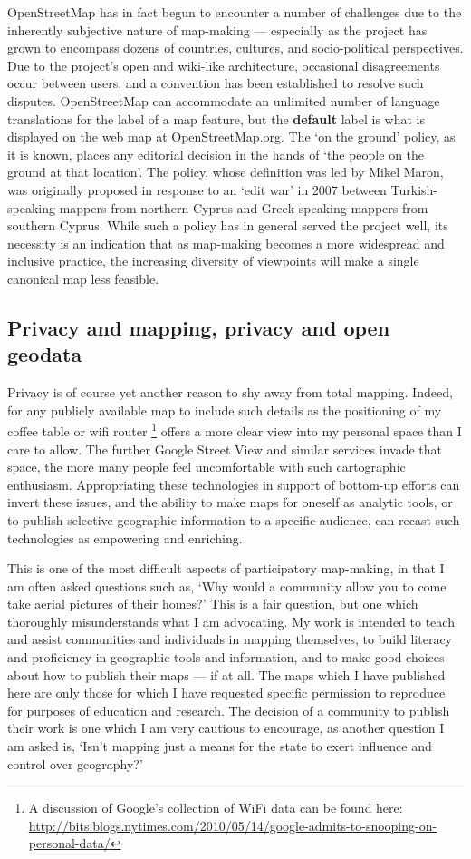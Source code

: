 \documentclass[11pt,oneside,notitlepage]{report}
\begin{document}
OpenStreetMap has in fact begun to encounter a number of challenges due to the inherently subjective nature of map-making --- especially as the project has grown to encompass dozens of countries, cultures, and socio-political perspectives. Due to the project's open and wiki-like architecture, occasional disagreements occur between users, and a convention has been established to resolve such disputes. OpenStreetMap can accommodate an unlimited number of language translations for the label of a map feature, but the \textbf{default} label is what is displayed on the web map at OpenStreetMap.org. The `on the ground' policy, as it is known, places any editorial decision in the hands of `the people on the ground at that location'. The policy, whose definition was led by Mikel Maron, was originally proposed in response to an `edit war' in 2007 between Turkish-speaking mappers from northern Cyprus and Greek-speaking mappers from southern Cyprus. \cite{osm2007disputes} While such a policy has in general served the project well, its necessity is an indication that as map-making becomes a more widespread and inclusive practice, the increasing diversity of viewpoints will make a single canonical map less feasible. 

\subsection{Privacy and mapping, privacy and open geodata}

Privacy is of course yet another reason to shy away from total mapping. Indeed, for any publicly available map to include such details as the positioning of my coffee table or wifi router \footnote{A discussion of Google's collection of WiFi data can be found here: \url{http://bits.blogs.nytimes.com/2010/05/14/google-admits-to-snooping-on-personal-data/}} offers a more clear view into my personal space than I care to allow. The further Google Street View and similar services invade that space, the more many people feel uncomfortable with such cartographic enthusiasm. Appropriating these technologies in support of bottom-up efforts can invert these issues, and the ability to make maps for oneself as analytic tools, or to publish selective geographic information to a specific audience, can recast such technologies as empowering and enriching.  

This is one of the most difficult aspects of participatory map-making, in that I am often asked questions such as, `Why would a community allow you to come take aerial pictures of their homes?' This is a fair question, but one which thoroughly misunderstands what I am advocating. My work is intended to teach and assist communities and individuals in mapping themselves, to build literacy and proficiency in geographic tools and information, and to make good choices about how to publish their maps --- if at all. The maps which I have published here are only those for which I have requested specific permission to reproduce for purposes of education and research. The decision of a community to publish their work is one which I am very cautious to encourage, as another question I am asked is, `Isn't mapping just a means for the state to exert influence and control over geography?' 
\end{document}
